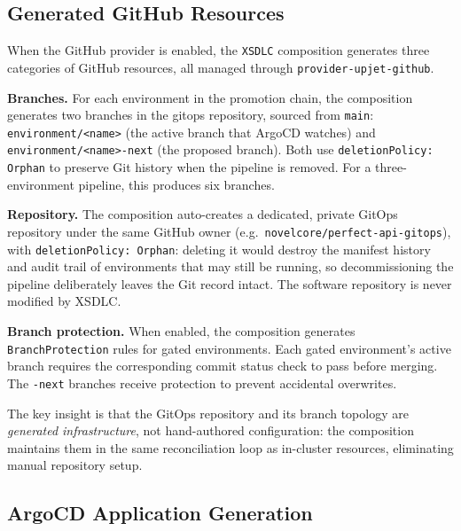 \subsection{Generated GitHub Resources}
\label{subsec:generated-github}

When the GitHub provider is enabled, the \texttt{XSDLC} composition generates three categories of GitHub resources, all managed through \texttt{provider-upjet-github}.

\textbf{Branches.} For each environment in the promotion chain, the composition generates two branches in the gitops repository, sourced from \texttt{main}: \texttt{environment/<name>} (the active branch that ArgoCD watches) and \texttt{environment/<name>-next} (the proposed branch). Both use \texttt{deletionPolicy: Orphan} to preserve Git history when the pipeline is removed. For a three-environment pipeline, this produces six branches.

\textbf{Repository.} The composition auto-creates a dedicated, private GitOps repository under the same GitHub owner (e.g.\ \texttt{novelcore/\allowbreak perfect-api-gitops}), with \texttt{deletionPolicy: Orphan}: deleting it would destroy the manifest history and audit trail of environments that may still be running, so decommissioning the pipeline deliberately leaves the Git record intact. The software repository is never modified by XSDLC.

\textbf{Branch protection.} When enabled, the composition generates \texttt{BranchProtection} rules for gated environments. Each gated environment's active branch requires the corresponding commit status check to pass before merging. The \texttt{-next} branches receive protection to prevent accidental overwrites.

The key insight is that the GitOps repository and its branch topology are \textit{generated infrastructure}, not hand-authored configuration: the composition maintains them in the same reconciliation loop as in-cluster resources, eliminating manual repository setup.

\subsection{ArgoCD Application Generation}
\label{subsec:argocd-generation}

